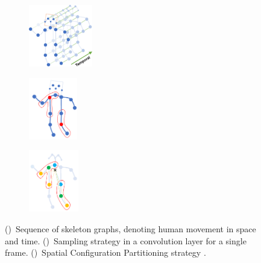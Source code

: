 \begin{figure}
    \centering
    \begin{subfigure}{.30\textwidth}
        \centering
        \includegraphics[height=2.7cm]{images/st_gcn_graph}
        \caption{}
        \label{fig:st-gcn-graph}
    \end{subfigure}
    \begin{subfigure}{.30\textwidth}
      \centering
      \includegraphics[height=2.7cm]{images/st_gcn_sampling}
      \caption{}
      \label{fig:st-gcn-sampling}
    \end{subfigure}
    \begin{subfigure}{.30\textwidth}
      \centering
      \includegraphics[height=2.7cm]{images/st_gcn_spatial_partitioning}
      \caption{}
      \label{fig:st-gcn-spatial-part}
    \end{subfigure}
    \caption{
        ()~Sequence of skeleton graphs, denoting human movement in space and time. 
        ()~Sampling strategy in a convolution layer for a single frame.
        ()~Spatial Configuration Partitioning strategy \cite{st-gcn-2018}.
    }
    \label{fig:graph_part_sampling}
\end{figure}    

    

